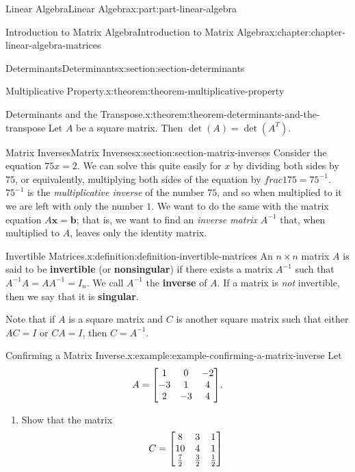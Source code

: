 \documentclass[twoside,10pt,]{book}
\newcommand{\terminology}[1]{\textbf{#1}}
\numberwithin{equation}{part}
\providecommand{\vb}[1]{\mathbf{#1}}
\begin{document}
\begin{partptx}{Linear Algebra}{}{Linear Algebra}{}{}{x:part:part-linear-algebra}
\begin{chapterptx}{Introduction to Matrix Algebra}{}{Introduction to Matrix Algebra}{}{}{x:chapter:chapter-linear-algebra-matrices}
\begin{sectionptx}{Determinants}{}{Determinants}{}{}{x:section:section-determinants}
\begin{theorem}{Multiplicative Property.}{}{x:theorem:theorem-multiplicative-property}
\end{theorem}
\begin{theorem}{Determinants and the Transpose.}{}{x:theorem:theorem-determinants-and-the-transpose}%
Let \(A\) be a square matrix. Then \(\det(A) = \det(A^T)\).%
\end{theorem}
\end{sectionptx}
%
%
\typeout{************************************************}
\typeout{************************************************}
%
\begin{sectionptx}{Matrix Inverses}{}{Matrix Inverses}{}{}{x:section:section-matrix-inverses}
Consider the equation \(75x = 2\). We can solve this quite easily for \(x\) by dividing both sides by \(75\), or equivalently, multiplying both sides of the equation by \(frac{1}{75} = 75^{-1}\). \(75^{-1}\) is the \emph{multiplicative inverse} of the number \(75\), and so when multiplied to it we are left with only the number \(1\). We want to do the same with the matrix equation \(A\vb{x} = \vb{b}\); that is, we want to find an \emph{inverse matrix} \(A^{-1}\) that, when multiplied to \(A\), leaves only the identity matrix.%
\begin{definition}{Invertible Matrices.}{x:definition:definition-invertible-matrices}%
%
An \(n\times n\) matrix \(A\) is said to be \terminology{invertible} (or \terminology{nonsingular}) if there exists a matrix \(A^{-1}\) such that \(A^{-1}A = AA^{-1} = I_{n}\). We call \(A^{-1}\) the \terminology{inverse} of \(A\). If a matrix is \emph{not} invertible, then we say that it is \terminology{singular}.%
\end{definition}
Note that if \(A\) is a square matrix and \(C\) is another square matrix such that either \(AC = I\) or \(CA = I\), then \(C = A^{-1}\).%
\begin{example}{Confirming a Matrix Inverse.}{x:example:example-confirming-a-matrix-inverse}%
Let%
\begin{equation*}
A = \mqty[1 & 0 & -2 \\ -3 & 1 & 4 \\ 2 & -3 & 4].
\end{equation*}
%
%
\begin{enumerate}
\item{}Show that the matrix%
\begin{equation*}
C = \mqty[8 & 3 & 1 \\ 10 & 4 & 1 \\ \frac{7}{2} & \frac{3}{2} & \frac{1}{2}]
\end{equation*}

\end{enumerate}
\end{example}
\end{sectionptx}
\end{chapterptx}
\end{partptx}
\end{document}
